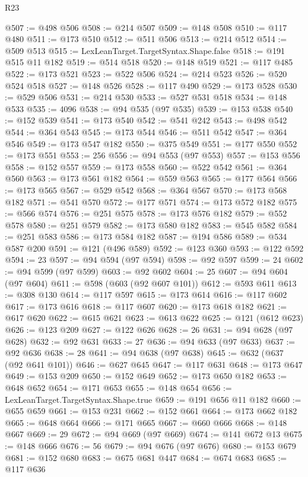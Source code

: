 \begin{lexlean}{R23}
\begin{coremodule}
@507 := @498 @506
@508 := @214 @507
@509 := @148 @508
@510 := @117 @480
@511 := @173 @510
@512 := @511 @506
@513 := @214 @512
@514 := @509 @513
@515 := LexLeanTarget.TargetSyntax.Shape.false
@518 := @191 @515 @11 @182
@519 := @514 @518
@520 := @148 @519
@521 := @117 @485
@522 := @173 @521
@523 := @522 @506
@524 := @214 @523
@526 := @520 @524 @518
@527 := @148 @526
@528 := @117 @490
@529 := @173 @528
@530 := @529 @506
@531 := @214 @530
@533 := @527 @531 @518
@534 := @148 @533
@535 := 4096
@538 := @94 @535 (@97 @535)
@539 := @153 @538
@540 := @152 @539
@541 := @173 @540
@542 := @541 @242
@543 := @498 @542
@544 := @364 @543
@545 := @173 @544
@546 := @511 @542
@547 := @364 @546
@549 := @173 @547 @182
@550 := @375 @549
@551 := @177 @550
@552 := @173 @551
@553 := 256
@556 := @94 @553 (@97 @553)
@557 := @153 @556
@558 := @152 @557
@559 := @173 @558
@560 := @522 @542
@561 := @364 @560
@563 := @173 @561 @182
@564 := @559 @563
@565 := @177 @564
@566 := @173 @565
@567 := @529 @542
@568 := @364 @567
@570 := @173 @568 @182
@571 := @541 @570
@572 := @177 @571
@574 := @173 @572 @182
@575 := @566 @574
@576 := @251 @575
@578 := @173 @576 @182
@579 := @552 @578
@580 := @251 @579
@582 := @173 @580 @182
@583 := @545 @582
@584 := @251 @583
@586 := @173 @584 @182
@587 := @194 @586
@589 := @534 @587 @200
@591 := @121 (@496 @589)
@592 := @123 @360
@593 := @122 @592
@594 := 23
@597 := @94 @594 (@97 @594)
@598 := @92 @597
@599 := 24
@602 := @94 @599 (@97 @599)
@603 := @92 @602
@604 := 25
@607 := @94 @604 (@97 @604)
@611 := @598 (@603 (@92 @607 @101))
@612 := @593 @611
@613 := @308 @130
@614 := @117 @597
@615 := @173 @614
@616 := @117 @602
@617 := @173 @616
@618 := @117 @607
@620 := @173 @618 @182
@621 := @617 @620
@622 := @615 @621
@623 := @613 @622
@625 := @121 (@612 @623)
@626 := @123 @209
@627 := @122 @626
@628 := 26
@631 := @94 @628 (@97 @628)
@632 := @92 @631
@633 := 27
@636 := @94 @633 (@97 @633)
@637 := @92 @636
@638 := 28
@641 := @94 @638 (@97 @638)
@645 := @632 (@637 (@92 @641 @101))
@646 := @627 @645
@647 := @117 @631
@648 := @173 @647
@649 := @153 @209
@650 := @152 @649
@652 := @173 @650 @182
@653 := @648 @652
@654 := @171 @653
@655 := @148 @654
@656 := LexLeanTarget.TargetSyntax.Shape.true
@659 := @191 @656 @11 @182
@660 := @655 @659
@661 := @153 @231
@662 := @152 @661
@664 := @173 @662 @182
@665 := @648 @664
@666 := @171 @665
@667 := @660 @666
@668 := @148 @667
@669 := 29
@672 := @94 @669 (@97 @669)
@674 := @141 @672 @13
@675 := @148 @666
@676 := 56
@679 := @94 @676 (@97 @676)
@680 := @153 @679
@681 := @152 @680
@683 := @675 @681 @447
@684 := @674 @683
@685 := @117 @636

\end{coremodule}
\end{lexlean}
